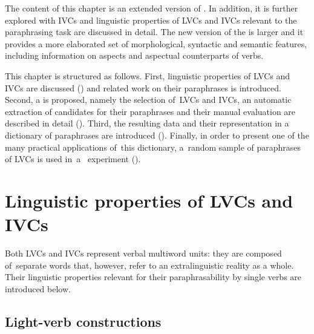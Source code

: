 \documentclass[output=paper
,modfonts
,nonflat]{langsci/langscibook}
\begin{document}
The content of this chapter is an extended version of \citet{barancikova2017paradi}.
In addition, it is further explored with IVCs and linguistic properties of LVCs and IVCs
relevant to the paraphrasing task are discussed in detail. The 
new version of the  is larger and it provides a more 
elaborated set of morphological, syntactic and semantic features, including 
information on aspects and aspectual counterparts of verbs.

This chapter is structured as follows. First, linguistic properties of LVCs and 
IVCs are discussed () and related work on their paraphrases is 
introduced. Second, a  is proposed, namely the 
selection of~LVCs and IVCs, an automatic extraction of candidates for their 
paraphrases and their manual evaluation are described in detail (). 
Third, the resulting data and their representation in a dictionary of 
paraphrases are introduced (). Finally, in order to present one 
of the many practical applications of~this dictionary, a~random sample of 
paraphrases of LVCs is used in~a~ experiment (). 

\section{Linguistic properties of LVCs and IVCs}
\label{liguistic}
Both LVCs and IVCs represent verbal multiword units: they are composed 
of~separate words that, however, refer to an extralinguistic reality as a whole. 
Their linguistic properties relevant for their paraphrasability by single verbs 
are introduced below. 

\subsection{Light-verb constructions}
\label{LVCs}
\end{document}
